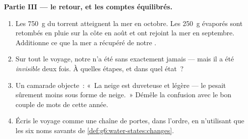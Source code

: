 \begin{problem}
\medskip\noindent\textbf{Partie III --- le retour, et les comptes
équilibrés.}
\begin{enumerate}[resume]
  \item Les \qty{750}{g} du torrent atteignent la mer en octobre.
        Les \qty{250}{g} évaporés sont retombés en pluie sur la côte
        en août et ont rejoint la mer en septembre. Additionne ce
        que la mer a récupéré de notre .
  \item Sur tout le voyage, notre  n'a été sans 
        exactement jamais --- mais il a été \emph{invisible} deux
        fois. À quelles étapes, et dans quel état~?
  \item Un camarade objecte~: «~La neige est duveteuse et légère ---
        le  pesait sûrement moins sous forme de neige.~»
        Démêle la confusion avec le bon couple de mots de cette
        année.
  \item Écris le voyage comme une chaîne de portes, dans l'ordre, en
        n'utilisant que les six noms savants de
        \cref{def:g6:water-states:changes}.
\end{enumerate}
\end{problem}
